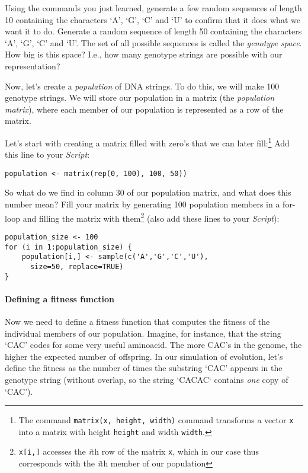 \documentclass[a4paper, 9pt]{article}
\begin{document}
\begin{exercise}
    \action Using the commands you just learned, generate a few random sequences of length 10 containing the characters `A', `G', `C' and `U' to confirm that it does what we want it to do.
    \action Generate a random sequence of length 50 containing the characters `A', `G', `C' and `U'. 
    \askstar The set of all possible sequences is called the \textit{genotype space}. How big is this space? I.e., how many genotype strings are possible with our representation?
\end{exercise}

Now, let's create a \textit{population} of DNA strings. To do this, we
will make 100 genotype strings.
We will store our population in a matrix (the \textit{population matrix}), where each member of our population is represented as a row of the matrix. 

\begin{exercise}
\action Let's start with creating a matrix filled with zero's that we can later fill:\footnote{The command \texttt{matrix(x, height, width)} command transforms a vector \texttt{x} into a matrix with height \texttt{height} and width \texttt{width}.} Add this line to your \emph{Script}:
  \begin{lstlisting}
population <- matrix(rep(0, 100), 100, 50))
\end{lstlisting}
  So what do we find in column 30 of our population matrix, and what does this number mean?
  \action Fill your matrix by generating 100 population members in a for-loop and filling the matrix with them\footnote{\texttt{x[i,]} accesses the \textit{i}th row of the matrix \texttt{x}, which in our case thus corresponds with the \textit{i}th member of our population} (also add these lines to your \emph{Script}):
  \begin{lstlisting}
population_size <- 100
for (i in 1:population_size) {
    population[i,] <- sample(c('A','G','C','U'), 
      size=50, replace=TRUE)
}
    \end{lstlisting}
\end{exercise}


\paragraph{Defining a fitness function}
Now we need to define a fitness function that computes the fitness of
the individual members of our population. Imagine, for instance, that
the string `CAC' codes for some very useful aminoacid. The more CAC's in
the genome, the higher the expected number of offspring. In our
simulation of evolution, let's define the fitness as the number of times
the substring `CAC' appears in the genotype string (without overlap, so the string `CACAC` contains \emph{one} copy of `CAC').
\end{document}
